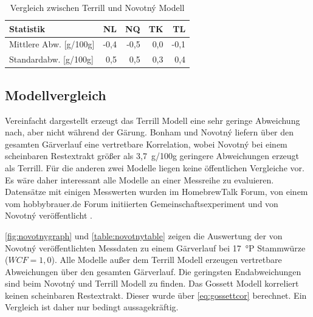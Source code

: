 \documentclass[a4paper,parskip=half]{scrartcl}
\newcommand{\wcf}{\mathit{WCF}}
\begin{document}
\begin{table}[h]
\centering
\begin{tabular}{lrrrr}
\toprule
Statistik & NL & NQ & TK & TL \\
\midrule
Mittlere Abw. [g/100g] & -0,4 & -0,5 & 0,0 & -0,1 \\
Standardabw. [g/100g] & 0,5 & 0,5 & 0,3 & 0,4 \\
\bottomrule
\end{tabular}
\caption{Vergleich zwischen Terrill und Novotný Modell}
\label{table:terrillnovotnycomp}
\end{table}

\subsection*{Modellvergleich}

Vereinfacht dargestellt erzeugt das Terrill Modell eine sehr geringe
Abweichung nach, aber nicht während der Gärung. Bonham und Novotný
liefern über den gesamten Gärverlauf eine vertretbare Korrelation,
wobei Novotný bei einem scheinbaren Restextrakt größer als 3,7~g/100g
geringere Abweichungen erzeugt als Terrill. Für die anderen zwei Modelle
liegen keine öffentlichen Vergleiche vor. Es wäre daher interessant
alle Modelle an einer Messreihe zu evaluieren. Datensätze mit einigen
Messwerten wurden im HomebrewTalk Forum, von einem vom hobbybrauer.de Forum
initiierten Gemeinschaftsexperiment und von Novotný veröffentlicht
\autocite{Novotny2017a,Katman2019,Wolf2015}.

\autoref{fig:novotnygraph} und \autoref{table:novotnytable} zeigen die
Auswertung der von Novotný veröffentlichten Messdaten zu einem
Gärverlauf bei 17~°P Stammwürze ($\wcf = 1,0$). Alle Modelle außer dem
Terrill Modell erzeugen vertretbare Abweichungen über den gesamten
Gärverlauf. Die geringsten Endabweichungen sind beim Novotný und Terrill
Modell zu finden. Das Gossett Modell korreliert keinen scheinbaren Restextrakt.
Dieser wurde über \autoref{eq:gossettcor} berechnet. Ein Vergleich
ist daher nur bedingt aussagekräftig.
\end{document}
